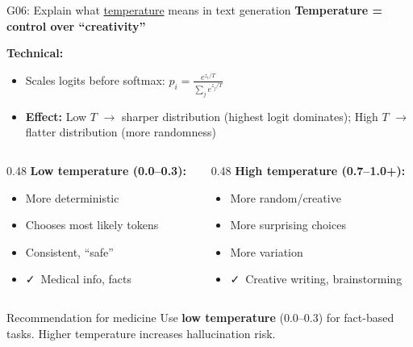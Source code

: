 \documentclass[aspectratio=169, 10pt]{beamer}
\begin{document}
\begin{frame}{G06: Explain what \href{https://en.wikipedia.org/wiki/Softmax_function\#Softmax_temperature}{temperature} means in text generation}
    \textbf{Temperature = control over ``creativity''}

    \vspace{0.15cm}
    \textbf{Technical:}
    \begin{itemize}
        \item Scales logits before softmax: $p_i = \frac{e^{z_i/T}}{\sum_j e^{z_j/T}}$
        \item \textbf{Effect:} Low $T$ $\rightarrow$ sharper distribution (highest logit dominates); High $T$ $\rightarrow$ flatter distribution (more randomness)
    \end{itemize}

    \vspace{0.2cm}
    \begin{columns}[T]
        \begin{column}{0.48\textwidth}
            \textbf{Low temperature (0.0--0.3):}
            \begin{itemize}
                \item More deterministic
                \item Chooses most likely tokens
                \item Consistent, ``safe''
                \item \faCheck~Medical info, facts
            \end{itemize}
        \end{column}
        \begin{column}{0.48\textwidth}
            \textbf{High temperature (0.7--1.0+):}
            \begin{itemize}
                \item More random/creative
                \item More surprising choices
                \item More variation
                \item \faCheck~Creative writing, brainstorming
            \end{itemize}
        \end{column}
    \end{columns}

    \vspace{0.15cm}
    \begin{block}{\footnotesize Recommendation for medicine}
        \footnotesize Use \textbf{low temperature} (0.0--0.3) for fact-based tasks. Higher temperature increases hallucination risk.
    \end{block}
\end{frame}
\end{document}
